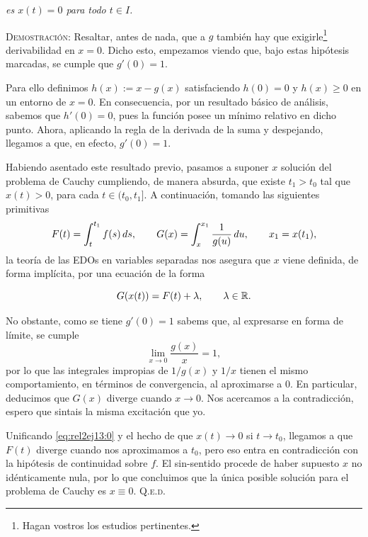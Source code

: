 \documentclass{article}
\begin{document}
\begin{enumerate}
    \textit{es $x(t) = 0$ para todo $t \in I$.}

    \vspace{7px}

    \textsc{Demostración}: Resaltar, antes de nada, que a $g$ también hay que exigirle\footnote{Hagan vostros los estudios pertinentes.} derivabilidad en $x = 0$. Dicho esto, empezamos viendo que, bajo estas hipótesis marcadas, se cumple que $g'(0) = 1$. 
    
    Para ello definimos $h(x) := x - g(x)$ satisfaciendo $h(0) = 0$ y $h(x) \geq 0$ en un entorno de $x = 0$. En consecuencia, por un resultado básico de análisis, sabemos que $h'(0) = 0$, pues la función posee un mínimo relativo en dicho punto.
    Ahora, aplicando la regla de la derivada de la suma y despejando, llegamos a que, en efecto, $g'(0) = 1$.

    Habiendo asentado este resultado previo, pasamos a suponer $x$ solución del problema de Cauchy cumpliendo, de manera absurda, que existe $t_1 > t_0$ tal que $x(t) > 0$, para cada $t \in (t_0, t_1]$. A continuación, tomando las siguientes primitivas \[F(t) = \int_{t}^{t_1} f(s)\,ds, \hspace{20px} G(x) = \int_{x}^{x_1} \frac{1}{g(u)}\,du, \hspace{20px} x_1 = x(t_1),\]
    la teoría de las EDOs en variables separadas nos asegura que $x$ viene definida, de forma implícita, por una ecuación de la forma

    \begin{equation}
        G(x(t)) = F(t) + \lambda, \hspace{20px} \lambda \in \mathbb{R}.
        \label{eq:rel2ej13:0}
    \end{equation}

    No obstante, como se tiene $g'(0) = 1$ sabems que, al expresarse en forma de límite, se cumple \[\lim_{x \to 0} \frac{g(x)}{x} = 1,\] por lo que las integrales impropias de $1/g(x)$ y $1/x$ tienen el mismo comportamiento, en términos de convergencia, al aproximarse a $0$. En particular, deducimos que $G(x)$ diverge cuando $x \to 0$. Nos acercamos a la contradicción, espero que sintais la misma excitación que yo.

    Unificando \eqref{eq:rel2ej13:0} y el hecho de que $x(t) \to 0$ si $t \to t_0$, llegamos a que $F(t)$ diverge cuando nos aproximamos a $t_0$, pero eso entra en contradicción con la hipótesis de continuidad sobre $f$. El sin-sentido procede de haber supuesto $x$ no idénticamente nula, por lo que concluimos que la única posible solución para el problema de Cauchy es $x \equiv 0$. \hfill{\textsc{Q.e.d.}}
\end{enumerate}
\end{document}
